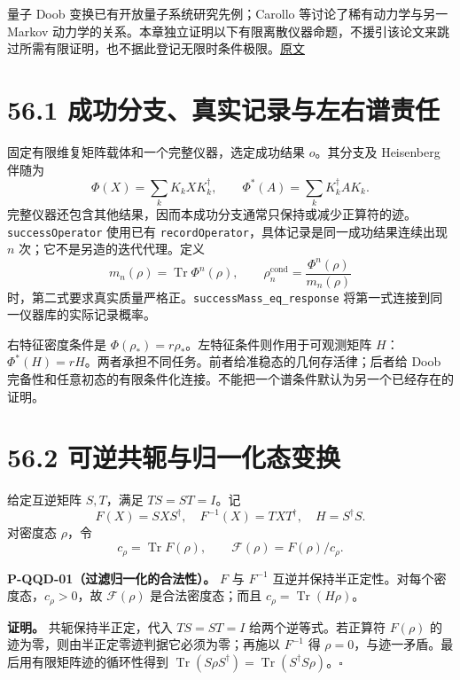 \documentclass[
  11pt,
  oneside]{book}
\begin{document}
量子 Doob 变换已有开放量子系统研究先例；Carollo 等讨论了稀有动力学与另一
Markov
动力学的关系。本章独立证明以下有限离散仪器命题，不援引该论文来跳过所需有限证明，也不据此登记无限时条件极限。\href{https://arxiv.org/abs/1711.10951}{原文}

\hypertarget{ux6210ux529fux5206ux652fux771fux5b9eux8bb0ux5f55ux4e0eux5de6ux53f3ux8c31ux8d23ux4efb}{%
\section{56.1
成功分支、真实记录与左右谱责任}\label{ux6210ux529fux5206ux652fux771fux5b9eux8bb0ux5f55ux4e0eux5de6ux53f3ux8c31ux8d23ux4efb}}

固定有限维复矩阵载体和一个完整仪器，选定成功结果 \(o\)。其分支及
Heisenberg 伴随为 \[
\Phi(X)=\sum_kK_kXK_k^\dagger,
\qquad \Phi^*(A)=\sum_kK_k^\dagger AK_k.
\]
完整仪器还包含其他结果，因而本成功分支通常只保持或减少正算符的迹。\texttt{successOperator}
使用已有 \texttt{recordOperator}，具体记录是同一成功结果连续出现 \(n\)
次；它不是另造的迭代代理。定义 \[
m_n(\rho)=\operatorname{Tr}\Phi^n(\rho),\qquad
\rho_n^{\mathrm{cond}}=\frac{\Phi^n(\rho)}{m_n(\rho)}
\] 时，第二式要求真实质量严格正。\texttt{successMass\_\allowbreak eq\_\allowbreak response}
将第一式连接到同一仪器库的实际记录概率。

右特征密度条件是 \(\Phi(\rho_*)=r\rho_*\)。左特征条件则作用于可观测矩阵
\(H\)：\(\Phi^*(H)=rH\)。两者承担不同任务。前者给准稳态的几何存活律；后者给
Doob
完备性和任意初态的有限条件化连接。不能把一个谱条件默认为另一个已经存在的证明。

\hypertarget{ux53efux9006ux5171ux8f6dux4e0eux5f52ux4e00ux5316ux6001ux53d8ux6362}{%
\section{56.2
可逆共轭与归一化态变换}\label{ux53efux9006ux5171ux8f6dux4e0eux5f52ux4e00ux5316ux6001ux53d8ux6362}}

给定互逆矩阵 \(S,T\)，满足 \(TS=ST=I\)。记 \[
F(X)=SXS^\dagger,\quad F^{-1}(X)=TXT^\dagger,
\quad H=S^\dagger S.
\] 对密度态 \(\rho\)，令 \[
c_\rho=\operatorname{Tr}F(\rho),\qquad
\mathcal F(\rho)=F(\rho)/c_\rho.
\]

\protect\hypertarget{p-qqd-01}{}{}

\textbf{P-QQD-01（过滤归一化的合法性）。} \(F\) 与 \(F^{-1}\)
互逆并保持半正定性。对每个密度态，\(c_\rho>0\)，故 \(\mathcal F(\rho)\)
是合法密度态；而且 \(c_\rho=\operatorname{Tr}(H\rho)\)。

\textbf{证明。} 共轭保持半正定，代入 \(TS=ST=I\) 给两个逆等式。若正算符
\(F(\rho)\) 的迹为零，则由半正定零迹判据它必须为零；再施以 \(F^{-1}\) 得
\(\rho=0\)，与迹一矛盾。最后用有限矩阵迹的循环性得到
\(\operatorname{Tr}(S\rho S^\dagger)=\operatorname{Tr}(S^\dagger S\rho)\)。\(\square\)
\end{document}
